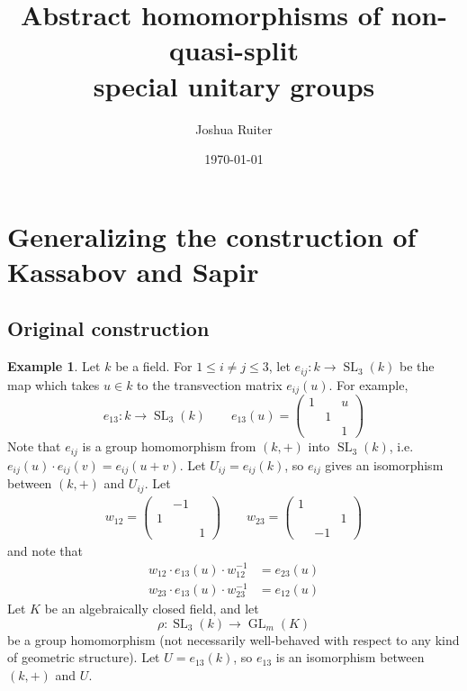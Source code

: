 \documentclass[12pt]{article}
\title{Abstract homomorphisms of non-quasi-split \\
special unitary groups}
\author{Joshua Ruiter}
\date{\today}
\theoremstyle{definition}
\newtheorem{example}{Example}
\newcommand{\inv}{^{-1}}
\DeclareMathOperator{\SL}{SL}
\DeclareMathOperator{\GL}{GL}
\begin{document}
\maketitle
\tableofcontents

\newpage

\section{Generalizing the construction of Kassabov and Sapir}

\subsection{Original construction}

\begin{example}
Let $k$ be a field.  For $1 \le i \neq j \le 3$, let $e_{ij}:k \to \SL_3(k)$ be the map which takes $u \in k$ to the transvection matrix $e_{ij}(u)$. For example,
\[
	e_{13}:k \to \SL_3(k) \qquad e_{13}(u) = \begin{pmatrix} 1 && u \\ & 1 \\ && 1 \end{pmatrix}
\]
Note that $e_{ij}$ is a group homomorphism from $(k,+)$ into $\SL_3(k)$, i.e. $e_{ij}(u) \cdot e_{ij}(v) = e_{ij}(u+v)$. Let $U_{ij} = e_{ij}(k)$, so $e_{ij}$ gives an isomorphism between $(k,+)$ and $U_{ij}$. Let
\begin{align*}
	w_{12} = 
	\begin{pmatrix}
		 & -1 \\
		1 \\
		&& 1
	\end{pmatrix}
	\qquad
	w_{23} = 
	\begin{pmatrix}
		1 \\
		&& 1 \\
		& -1 
	\end{pmatrix}
\end{align*}
and note that
\begin{align}
\label{w relation 1}
	w_{12} \cdot e_{13}(u) \cdot w_{12} \inv &= e_{23}(u) \\
\label{w relation 2}
	w_{23} \cdot e_{13}(u) \cdot w_{23} \inv &= e_{12}(u)
\end{align}
Let $K$ be an algebraically closed field, and let
\[
	\rho:\SL_3(k) \to \GL_m(K)
\]
be a group homomorphism (not necessarily well-behaved with respect to any kind of geometric structure). Let $U = e_{13}(k)$, so $e_{13}$ is an isomorphism between $(k,+)$ and $U$. 


\end{example}
\end{document}
